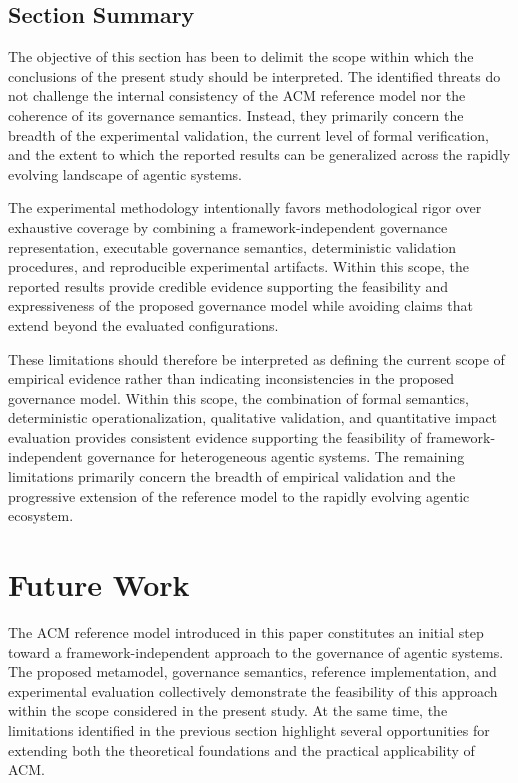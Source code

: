 \documentclass[10pt]{article}
\begin{document}
\subsection{Section Summary}
\label{sec:threats_summary}

The objective of this section has been to delimit the scope within which the conclusions of the present study should be interpreted. The identified threats do not challenge the internal consistency of the ACM reference model nor the coherence of its governance semantics. Instead, they primarily concern the breadth of the experimental validation, the current level of formal verification, and the extent to which the reported results can be generalized across the rapidly evolving landscape of agentic systems.

The experimental methodology intentionally favors methodological rigor over exhaustive coverage by combining a framework-independent governance representation, executable governance semantics, deterministic validation procedures, and reproducible experimental artifacts. Within this scope, the reported results provide credible evidence supporting the feasibility and expressiveness of the proposed governance model while avoiding claims that extend beyond the evaluated configurations.

These limitations should therefore be interpreted as defining the current scope of empirical evidence rather than indicating inconsistencies in the proposed governance model. Within this scope, the combination of formal semantics, deterministic operationalization, qualitative validation, and quantitative impact evaluation provides consistent evidence supporting the feasibility of framework-independent governance for heterogeneous agentic systems. The remaining limitations primarily concern the breadth of empirical validation and the progressive extension of the reference model to the rapidly evolving agentic ecosystem.

\section{Future Work}
\label{sec:future_work}

The ACM reference model introduced in this paper constitutes an initial step toward a framework-independent approach to the governance of agentic systems. The proposed metamodel, governance semantics, reference implementation, and experimental evaluation collectively demonstrate the feasibility of this approach within the scope considered in the present study. At the same time, the limitations identified in the previous section highlight several opportunities for extending both the theoretical foundations and the practical applicability of ACM.
\end{document}
